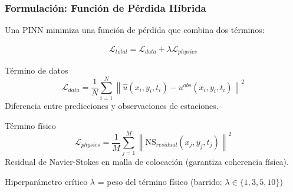 \begin{frame}[fragile,shrink=8]
  \frametitle{Formulación: Función de Pérdida Híbrida}
  
  Una PINN minimiza una función de pérdida que combina dos términos:
  
  \begin{align*}
    \mathcal{L}_{total} = \mathcal{L}_{data} + \lambda \mathcal{L}_{physics}
  \end{align*}
  
  \begin{block}{Término de datos}
    \[\mathcal{L}_{data} = \frac{1}{N} \sum_{i=1}^{N} \left\| \hat{u}(x_i, y_i, t_i) - u^{obs}(x_i, y_i, t_i) \right\|^2\]
    Diferencia entre predicciones y observaciones de estaciones.
  \end{block}
  
  \begin{block}{Término físico}
    \[\mathcal{L}_{physics} = \frac{1}{M} \sum_{j=1}^{M} \left\| \text{NS}_{residual}(x_j, y_j, t_j) \right\|^2\]
    Residual de Navier-Stokes en malla de colocación (garantiza coherencia física).
  \end{block}
  
  \begin{alertblock}{Hiperparámetro crítico}
    $\lambda$ = peso del término físico (barrido: $\lambda \in \{1, 3, 5, 10\}$)
  \end{alertblock}
  
\end{frame}
